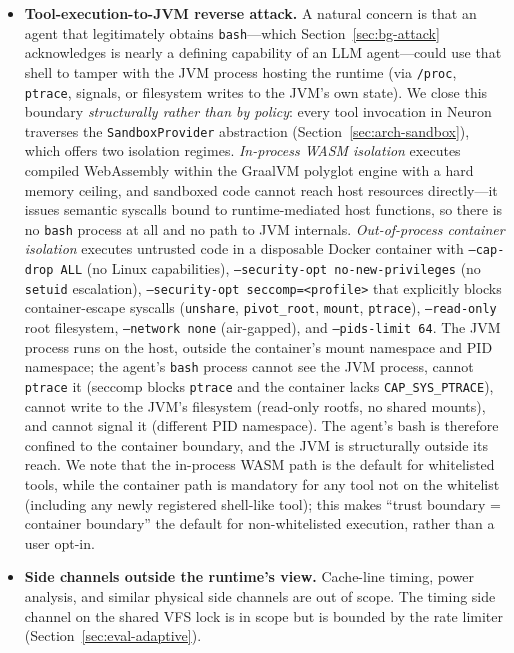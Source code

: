\begin{itemize}
    \item \textbf{Tool-execution-to-JVM reverse attack.} A natural
    concern is that an agent that legitimately obtains
    \texttt{bash}---which Section~\ref{sec:bg-attack} acknowledges is
    nearly a defining capability of an LLM agent---could use that shell
    to tamper with the JVM process hosting the runtime (via
    \texttt{/proc}, \texttt{ptrace}, signals, or filesystem writes to
    the JVM's own state). We close this boundary \emph{structurally
    rather than by policy}: every tool invocation in Neuron traverses
    the \texttt{SandboxProvider} abstraction
    (Section~\ref{sec:arch-sandbox}), which offers two isolation
    regimes. \emph{In-process WASM isolation} executes compiled
    WebAssembly within the GraalVM polyglot engine with a hard memory
    ceiling, and sandboxed code cannot reach host resources
    directly---it issues semantic syscalls bound to runtime-mediated
    host functions, so there is no \texttt{bash} process at all and no
    path to JVM internals. \emph{Out-of-process container isolation}
    executes untrusted code in a disposable Docker container with
    \texttt{--cap-drop ALL} (no Linux capabilities),
    \texttt{--security-opt no-new-privileges} (no \texttt{setuid}
    escalation), \texttt{--security-opt seccomp=<profile>} that
    explicitly blocks container-escape syscalls (\texttt{unshare},
    \texttt{pivot\_root}, \texttt{mount}, \texttt{ptrace}),
    \texttt{--read-only} root filesystem, \texttt{--network none}
    (air-gapped), and \texttt{--pids-limit 64}. The JVM process runs
    on the host, outside the container's mount namespace and PID
    namespace; the agent's \texttt{bash} process cannot see the JVM
    process, cannot \texttt{ptrace} it (seccomp blocks
    \texttt{ptrace} and the container lacks \texttt{CAP\_SYS\_PTRACE}),
    cannot write to the JVM's filesystem (read-only rootfs, no shared
    mounts), and cannot signal it (different PID namespace). The
    agent's bash is therefore confined to the container boundary, and
    the JVM is structurally outside its reach. We note that the
    in-process WASM path is the default for whitelisted tools, while
    the container path is mandatory for any tool not on the whitelist
    (including any newly registered shell-like tool); this makes
    ``trust boundary = container boundary'' the default for
    non-whitelisted execution, rather than a user opt-in.

    \item \textbf{Side channels outside the runtime's view.} Cache-line
    timing, power analysis, and similar physical side channels are out
    of scope. The timing side channel on the shared VFS lock is in
    scope but is bounded by the rate limiter
    (Section~\ref{sec:eval-adaptive}).


\end{itemize}
